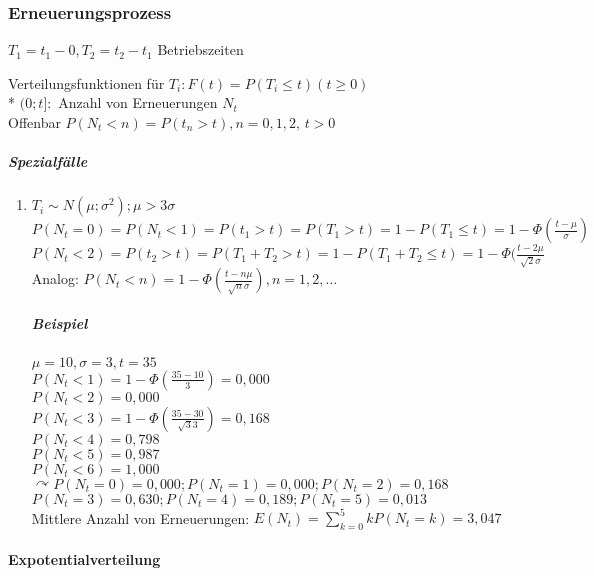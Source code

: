 \documentclass[a4paper]{scrartcl}
\begin{document}
\subsubsection{Erneuerungsprozess} %
$T_1 = t_1 - 0, T_2 = t_2 - t_1$ Betriebszeiten

Verteilungsfunktionen für $T_i: F(t) = P(T_i \leq t) (t \geq 0 )$\\*
$(0;t]:$ Anzahl von Erneuerungen $N_t$\\
Offenbar $P(N_t < n) = P(t_n > t), n=0,1,2,\, t > 0$
\subparagraph{Spezialfälle}
\begin{enumerate}
\item $T_i \sim N (\mu; \sigma^2); \mu > 3 \sigma$\\
$P(N_t = 0) = P(N_t < 1) = P(t_1 > t) = P(T_1 > t) = 1 - P(T_1 \leq t) = 1 - \Phi ( \frac{t-\mu}{\sigma} )$\\
$P (N_t < 2) = P(t_2 > t) = P(T_1 + T_2 > t) = 1- P(T_1 + T_2 \leq t ) = 1- \Phi (\frac{t - 2 \mu}{\sqrt{2} \sigma}$\\
Analog: $P(N_t < n ) = 1 - \Phi ( \frac{t-n \mu}{\sqrt{n} \sigma}), n = 1,2,\dots$

\subparagraph{Beispiel} $\mu = 10, \sigma = 3, t = 35$\\
$P(N_t < 1) = 1 - \Phi (\frac{35-10}{3}) = 0,000$\\
$P(N_t < 2) = 0,000$\\
$P(N_t < 3) = 1 - \Phi (\frac{35-30}{\sqrt{3} 3}) = 0,168$\\
$P(N_t < 4) = 0,798$\\
$P(N_t < 5) = 0,987$\\
$P(N_t < 6) = 1,000$\\
$\curvearrowright P(N_t = 0) = 0,000; P(N_t = 1) = 0,000; P(N_t = 2) = 0,168$\\
$P(N_t = 3 ) = 0,630; P(N_t = 4) = 0,189; P(N_t = 5) = 0,013$\\
Mittlere Anzahl von Erneuerungen:
$ E(N_t) = \sum\limits_{k=0}^5 k P(N_t = k) = 3,047$
\end{enumerate}

\paragraph{Expotentialverteilung}
\end{document}
